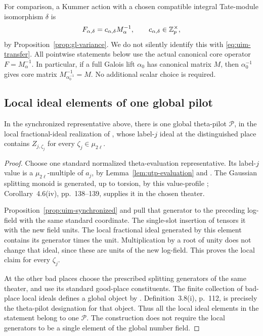 For comparison, a Kummer action with a
chosen compatible integral Tate-module
isomorphism \(\delta\) is
\[
 F_{\alpha,\delta}=c_{\alpha,\delta}M_\alpha^{-1},
                 \qquad c_{\alpha,\delta}\in\mathbb Z_p^\times,
\]
by Proposition~\ref{prop:gl-variance}.
We do not silently identify this with
\eqref{eq:uim-transfer}. All pointwise
statements below use the actual canonical
core operator \(F=M_\alpha^{-1}\).
In particular, if a full Galois lift
\(\alpha_0\) has canonical matrix \(M\),
then \(\alpha_0^{-1}\) gives core matrix
\(M_{\alpha_0^{-1}}^{-1}=M\).
No additional scalar choice is required.

\subsection{Local ideal elements of one global pilot}

\begin{lemma}
\label{lem:uim-pilot-points}
In the synchronized representative above,
there is one global theta-pilot
\(\mathcal P\), in the local fractional-ideal
realization of
\cite[Definition~3.8(i)]{IUT3}, whose
label-\(j\) ideal at the distinguished
place contains \(Z_{j,\zeta_j}\) for
every \(\zeta_j\in\mu_{2\ell}\).
\end{lemma}
\begin{proof}
Choose one standard normalized theta-evaluation
representative. Its label-\(j\) value is a
\(\mu_{2\ell}\)-multiple of \(a_j\), by
Lemma~\ref{lem:utp-evaluation} and
\cite[Remark~2.5.1(i), p.~72]{IUT2}.
The Gaussian splitting monoid is generated,
up to torsion, by this value-profile
\cite[Corollary~3.6(ii),(iii), pp.~99--100]{IUT2};
Corollary~4.6(iv), pp.~138--139, supplies
it in the chosen theater.

Proposition~\ref{prop:uim-synchronized} and
\cite[Proposition~3.4(ii)]{IUT3} pull that
generator to the preceding log-field with
the same standard coordinate.
The single-slot insertion of
\cite[Proposition~3.1(ii), p.~93]{IUT3}
tensors it with the new field units.
The local fractional ideal generated by
this element contains its generator
times the unit. Multiplication by a
root of unity does not change that
ideal, since these are units of the
new log-field. This proves the local
claim for every \(\zeta_j\).

At the other bad places choose the
prescribed splitting generators of the
same theater, and use its standard
good-place constituents. The finite
collection of bad-place local ideals
defines a global object by
\cite[Proposition~3.7(v), pp.~111--112]{IUT3}.
Definition~3.8(i), p.~112, is precisely
the theta-pilot designation for that
object. Thus all the local ideal
elements in the statement belong
to one \(\mathcal P\).
The construction does not require
the local generators to be a
single element of the global
number field.
\end{proof}

